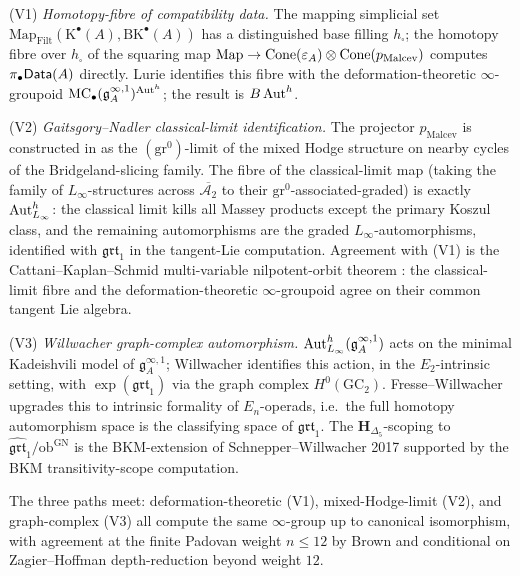 \begin{remark}
\label{rem:compat-data-three-paths}
%
\textup{(V1)} \emph{Homotopy-fibre of compatibility data.} The mapping
simplicial set
$\mathrm{Map}_{\mathrm{Filt}}(\mathrm{K}^\bullet(A),
 \mathrm{BK}^\bullet(A))$ has a distinguished base filling $h_\square$;
the homotopy fibre over $h_\square$ of the squaring map
$\mathrm{Map}\to\mathrm{Cone}(\varepsilon_A)\otimes\mathrm{Cone}(p_{\mathrm{Malcev}})$
computes $\pi_\bullet\mathsf{Data}(A)$ directly. Lurie
\cite[Proposition~5.5.1.1]{HA} identifies this fibre with the
deformation-theoretic $\infty$-groupoid
$\mathrm{MC}_\bullet(\mathfrak g^{\infty,1}_A)^{\operatorname{Aut}^h}$; the result is
$B\operatorname{Aut}^h$.

\textup{(V2)} \emph{Gaitsgory--Nadler classical-limit identification.}
The projector $p_{\mathrm{Malcev}}$ is constructed in
\cite[]{GaitsgoryNadler2009} as the
$(\mathrm{gr}^0)$-limit of the mixed Hodge structure on nearby cycles of
the Bridgeland-slicing family. The fibre of the classical-limit map
(taking the family of $L_\infty$-structures across
$\overline{\mathcal A_2}$ to their $\mathrm{gr}^0$-associated-graded) is
exactly $\operatorname{Aut}^h_{L_\infty}$: the classical limit kills all Massey
products except the primary Koszul class, and the remaining
automorphisms are the graded $L_\infty$-automorphisms, identified with
$\mathfrak{grt}_1$ in the tangent-Lie computation. Agreement with (V1)
is the Cattani--Kaplan--Schmid multi-variable nilpotent-orbit theorem
\cite[]{CattaniKaplanSchmid1986}: the classical-limit
fibre and the deformation-theoretic $\infty$-groupoid agree on
their common tangent Lie algebra.

\textup{(V3)} \emph{Willwacher graph-complex automorphism.}
$\operatorname{Aut}^h_{L_\infty}(\mathfrak g^{\infty,1}_A)$ acts on the minimal
Kadeishvili model of $\mathfrak g^{\infty,1}_A$; Willwacher
\cite[Theorem~1.1]{Willwacher15} identifies this action, in the
$E_2$-intrinsic setting, with $\exp(\mathfrak{grt}_1)$ via the graph
complex $H^0(\mathrm{GC}_2)$. Fresse--Willwacher
\cite[Theorem~B]{FresseWillwacher20} upgrades this to intrinsic
formality of $E_n$-operads, i.e.\ the full homotopy automorphism space
is the classifying space of $\mathfrak{grt}_1$. The $\mathbf
H_{\Delta_5}$-scoping to $\widehat{\mathfrak{grt}}_1/\mathrm{ob}^{\mathrm{GN}}$
is the BKM-extension of Schnepper--Willwacher 2017 supported by the
BKM transitivity-scope computation.

The three paths meet: deformation-theoretic (V1), mixed-Hodge-limit
(V2), and graph-complex (V3) all compute the same $\infty$-group up to
canonical isomorphism, with agreement at the finite Padovan weight
$n\le 12$ by Brown \cite[Theorem~1.2]{Brown12} and conditional on
Zagier--Hoffman depth-reduction beyond weight $12$.
\end{remark}

